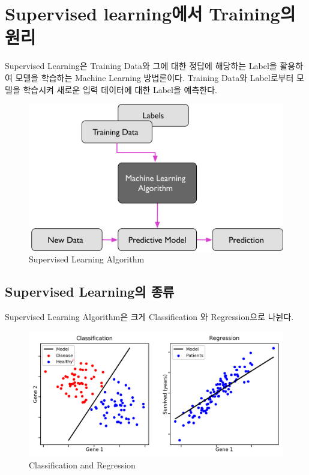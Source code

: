 \section{Supervised learning에서 Training의 원리}
    Supervised Learning은 Training Data와 그에 대한 정답에 해당하는 Label을 활용하여 모델을 학습하는 Machine Learning 방법론이다. Training Data와 Label로부터 모델을 학습시켜 새로운 입력 데이터에 대한 Label을 예측한다. \\
    \vspace{-4mm}
    \begin{figure}[!h]\centering
	    \includegraphics[width=.65\textwidth]{image/week04/1-1.png}
	    \caption{\small Supervised Learning Algorithm}
	    \vspace{-10pt}
    \end{figure}
    
    \subsection{Supervised Learning의 종류}
    Supervised Learning Algorithm은 크게 Classification 와 Regression으로 나뉜다. 
    \vspace{-4mm}
    \begin{figure}[!h]\centering
	    \includegraphics[width=.65\textwidth]{image/week04/1-2.png}
	    \caption{\small Classification and Regression}
	    \vspace{-10pt}
    \end{figure}
    
